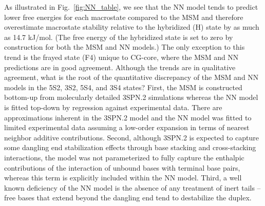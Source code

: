 \documentclass[journal=jpcbfk,manuscript=article]{achemso}
\begin{document}
As illustrated in Fig.~\ref{fig:NN_table}, we see that the NN model tends to predict lower free energies for each macrostate compared to the MSM and therefore overestimate macrostate stability relative to the hybridized (H) state by as much as 14.7 kJ/mol. (The free energy of the hybridized state is set to zero by construction for both the MSM and NN models.) The only exception to this trend is the frayed state (F4) unique to CG-core, where the MSM and NN predictions are in good agreement. Although the trends are in qualitative agreement, what is the root of the quantitative discrepancy of the MSM and NN models in the 5S2, 3S2, 5S4, and 3S4 states? First, the MSM is constructed bottom-up from molecularly detailed 3SPN.2 simulations whereas the NN model is fitted top-down by regression against experimental data. There are approximations inherent in the 3SPN.2 model and the NN model was fitted to limited experimental data assuming a low-order expansion in terms of nearest neighbor additive contributions. Second, although 3SPN.2 is expected to capture some dangling end stabilization effects through base stacking and cross-stacking interactions, the model was not parameterized to fully capture the enthalpic contributions of the interaction of unbound bases with terminal base pairs, whereas this term is explicitly included within the NN model. Third, a well known deficiency of the NN model is the absence of any treatment of inert tails -- free bases that extend beyond the dangling end tend to destabilize the duplex.\citep{Michele2014EHybridization}

\end{document}
